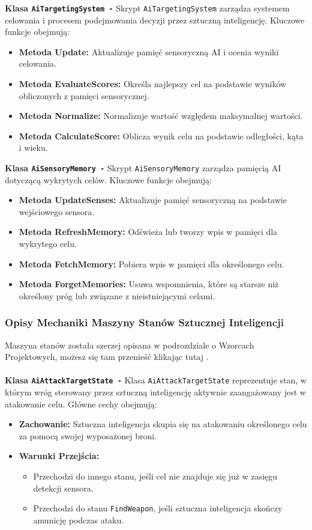 \textbf{Klasa \texttt{AiTargetingSystem -}}
Skrypt \texttt{AiTargetingSystem} zarządza systemem celowania i procesem podejmowania decyzji przez sztuczną inteligencję. Kluczowe funkcje obejmują:
\begin{itemize}
  \item \textbf{Metoda Update:} Aktualizuje pamięć sensoryczną AI i ocenia wyniki celowania.
  \item \textbf{Metoda EvaluateScores:} Określa najlepszy cel na podstawie wyników obliczonych z pamięci sensorycznej.
  \item \textbf{Metoda Normalize:} Normalizuje wartość względem maksymalnej wartości.
  \item \textbf{Metoda CalculateScore:} Oblicza wynik celu na podstawie odległości, kąta i wieku.
\end{itemize}

\textbf{Klasa \texttt{AiSensoryMemory -}}
Skrypt \texttt{AiSensoryMemory} zarządza pamięcią AI dotyczącą wykrytych celów. Kluczowe funkcje obejmują:
\begin{itemize}
  \item \textbf{Metoda UpdateSenses:} Aktualizuje pamięć sensoryczną na podstawie wejściowego sensora.
  \item \textbf{Metoda RefreshMemory:} Odświeża lub tworzy wpis w pamięci dla wykrytego celu.
  \item \textbf{Metoda FetchMemory:} Pobiera wpis w pamięci dla określonego celu.
  \item \textbf{Metoda ForgetMemories:} Usuwa wspomnienia, które są starsze niż określony próg lub związane z nieistniejącymi celami.
\end{itemize}

\subsubsection{Opisy Mechaniki Maszyny Stanów Sztucznej Inteligencji}
Maszyna stanów została szerzej opisana w podrozdziale o Wzorcach Projektowych, możesz się tam przenieść klikając tutaj . \\\\
\textbf{Klasa \texttt{AiAttackTargetState -}}
Klasa \texttt{AiAttackTargetState} reprezentuje stan, w którym wróg sterowany przez sztuczną inteligencję aktywnie zaangażowany jest w atakowanie celu. Główne cechy obejmują:
\begin{itemize}
  \item \textbf{Zachowanie:} Sztuczna inteligencja skupia się na atakowaniu określonego celu za pomocą swojej wyposażonej broni.
  \item \textbf{Warunki Przejścia:}
    \begin{itemize}
      \item Przechodzi do innego stanu, jeśli cel nie znajduje się już w zasięgu detekcji sensora.
      \item Przechodzi do stanu \texttt{FindWeapon}, jeśli sztuczna inteligencja skończy amunicję podczas ataku.
    \end{itemize}
\end{itemize}

